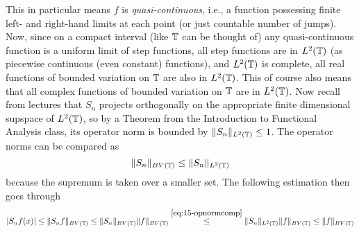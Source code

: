 \documentclass[a4paper, 12pt]{article}
\begin{document}
\begin{Exercise}
    This in particular means $f$ is \emph{quasi-continuous}, i.e., a function
    possessing finite left- and right-hand limits at each point (or just
    countable number of jumps).  Now, since on a compact interval (like $\mathbb{T}$
    can be thought of) any quasi-continuous function is a uniform limit of step
    functions, all step functions are in $L^2(\mathbb{T})$ (as piecewise continuous
    (even constant) functions), and $L^2(\mathbb{T})$ is complete, all real functions
    of bounded variation on $\mathbb{T}$ are also in $L^2(\mathbb{T})$.  This of course also
    means that all complex functions of bounded variation on $\mathbb{T}$ are in
    $L^2(\mathbb{T})$. Now recall from lectures that $S_n$ projects orthogonally on the
    appropriate finite dimensional supspace of $L^2(\mathbb{T})$, so by a Theorem from
    the Introduction to Functional Analysis class, its operator norm is bounded
    by $\| S_n \|_{L^2(\mathbb{T})} \leq 1$.  The operator norms can be compared as
    \begin{equation}
        \| S_n \|_{BV(\mathbb{T})} \leq \| S_n \|_{L^2(\mathbb{T})}
        \label{eq:15-opnormcomp}
    \end{equation}
    because the supremum is taken over a smaller set.  The following estimation
    then goes through
    \[
        | S_nf(x) |
        \leq \| S_nf \|_{BV(\mathbb{T})}
        \leq \| S_n \|_{BV(\mathbb{T})} \| f \|_{BV(\mathbb{T})}
        \overset{\eqref{eq:15-opnormcomp}}{\leq} \| S_n \|_{L^2(\mathbb{T})} \| f \|_{BV(\mathbb{T})}
        \leq \| f \|_{BV(\mathbb{T})}
    \]
\end{Exercise}
\end{document}
